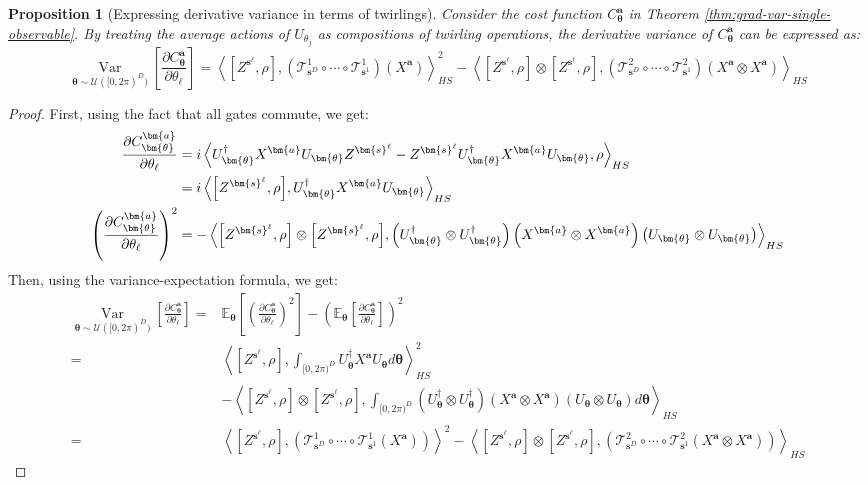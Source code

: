 \documentclass[a4paper,onecolumn,notitlepage,nofootinbib,longbibliography,superscriptaddress, floatfix, pra, aps, 10pt]{revtex4-2}
\newcommand{\inner}[2]{\left\langle #1, #2 \right\rangle}
\newcommand{\vttheta}{{\bm{\theta}}}
\newcommand{\vta}{{\bm{a}}}
\newcommand{\vtsl}{{\bm{s}^\ell}}
\newcommand{\vts}{{\bm{s}}}
\newtheorem{proposition}{Proposition}
\begin{document}
\begin{proposition} [Expressing derivative variance in terms of twirlings]  \label{prop: var_as_twirl}
Consider the cost function $C^\vta_\vttheta$ in Theorem \ref{thm:grad-var-single-observable}. By treating the average actions of $U_{\theta_j}$ as compositions of twirling operations, 
the derivative variance of $C^\vta_\vttheta$ can be expressed as:
\begin{equation}
\operatorname*{Var}_{\vttheta \sim \mathcal{U}([0,2\pi)^D)}\left[\frac{\partial C^\vta_\vttheta}{\partial {\theta_\ell}}\right] = \inner{\left[Z^\vtsl,\rho\right]}{
\left(\mathcal{T}^1_{\vts^D}\circ\cdots\circ\mathcal{T}^1_{\vts^1} \right)(X^\vta)}_{HS}^2 - \inner{\left[Z^\vtsl,\rho\right] \otimes \left[Z^\vtsl,\rho\right]}{\left(\mathcal{T}^2_{\vts^D}\circ\cdots\circ\mathcal{T}^2_{\vts^1} \right)(X^\vta \otimes X^\vta)}_{HS}
\end{equation}
\end{proposition}
\begin{proof}
First, using the fact that all gates commute, we get:
\begin{align}
    \frac{\partial C^\vta_\vttheta}{\partial {\theta_\ell}} &= i\inner{U_\vttheta^\dagger X^{\vta}U_\vttheta Z^\vtsl - Z^\vtsl U_\vttheta^\dagger X^{\vta}U_\vttheta}{\rho}_{HS}\\
    &= i\inner{\comm{Z^\vtsl}{\rho}} {U_\vttheta  ^\dagger X^{\vta}U_\vttheta }_{HS}\\
    \left(\frac{\partial C^\vta_\vttheta}{\partial {\theta_\ell}}\right)^2 &= -\inner{\comm{Z^\vtsl}{\rho} \otimes \comm{Z^\vtsl}{\rho}} {\left(U_\vttheta  ^\dagger \otimes U_\vttheta^\dagger \right) \left(X^{\vta} \otimes X^{\vta}\right)\left(U_\vttheta \otimes U_\vttheta\right)}_{HS}
\end{align}
Then, using the variance-expectation formula, we get:
\begin{align}
\operatorname*{Var}_{\vttheta \sim \mathcal{U}([0,2\pi)^D)}\left[\frac{\partial C^\vta_\vttheta}{\partial {\theta_\ell}}\right] =&  \mathbb{E}_\vttheta \left[\left(\frac{\partial C^\vta_\vttheta}{\partial {\theta_\ell}}\right)^2\right] - \left(\mathbb{E}_\vttheta \left[\frac{\partial C^\vta_\vttheta}{\partial {\theta_\ell}}\right]\right)^2\\
=& \inner{\left[Z^\vtsl,\rho\right]}{
\int_{[0,2\pi)^D} U_\vttheta^\dagger X^\vta U_\vttheta d \vttheta }^2_{HS} \\
& - \inner{\left[Z^\vtsl,\rho\right] \otimes \left[Z^\vtsl,\rho\right]}{\int_{[0,2\pi)^D}\left(U^\dagger_\vttheta \otimes U^\dagger_\vttheta \right) \left(X^{\vta} \otimes X^{\vta} \right) \left(U_\vttheta \otimes U_\vttheta \right) d \vttheta}_{HS} \\
=& \inner{\left[Z^\vtsl,\rho\right]}{
\left(\mathcal{T}^1_{\vts^D}\circ\cdots\circ\mathcal{T}^1_{\vts^1}(X^\vta) \right)}^2 - \inner{\left[Z^\vtsl,\rho\right] \otimes \left[Z^\vtsl,\rho\right]}{\left(\mathcal{T}^2_{\vts^D}\circ\cdots\circ\mathcal{T}^2_{\vts^1}(X^\vta \otimes X^\vta) \right)}_{HS}
\end{align}
\end{proof}
\end{document}

